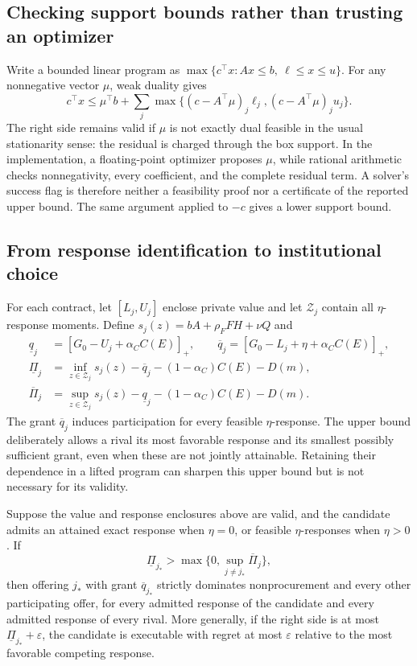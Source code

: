 \subsection{Checking support bounds rather than trusting an optimizer}
Write a bounded linear program as $\max\{c^\top x:Ax\leq b,\ \ell\leq x\leq u\}$. For any nonnegative vector $\mu$, weak duality gives
\begin{equation}
 c^\top x\leq \mu^\top b+
 \sum_j\max\{(c-A^\top\mu)_j\ell_j,(c-A^\top\mu)_ju_j\}.
 \label{eq:dual}
\end{equation}
The right side remains valid if $\mu$ is not exactly dual feasible in the usual stationarity sense: the residual is charged through the box support. In the implementation, a floating-point optimizer proposes $\mu$, while rational arithmetic checks nonnegativity, every coefficient, and the complete residual term. A solver's success flag is therefore neither a feasibility proof nor a certificate of the reported upper bound. The same argument applied to $-c$ gives a lower support bound.

\subsection{From response identification to institutional choice}
For each contract, let $[L_j,U_j]$ enclose private value and let $\mathcal Z_j$ contain all $\eta$-response moments. Define $s_j(z)=bA+\rho_F FH+\nu Q$ and
\begin{align}
 \underline q_j&=[G_0-U_j+\alpha_C C(E)]_+,\qquad
 \overline q_j=[G_0-L_j+\eta+\alpha_C C(E)]_+,\label{eq:grants}\\
 \underline\Pi_j&=\inf_{z\in\mathcal Z_j}s_j(z)-\overline q_j-(1-\alpha_C)C(E)-D(m),\label{eq:lowerprofit}\\
 \overline\Pi_j&=\sup_{z\in\mathcal Z_j}s_j(z)-\underline q_j-(1-\alpha_C)C(E)-D(m).\label{eq:upperprofit}
\end{align}
The grant $\overline q_j$ induces participation for every feasible $\eta$-response. The upper bound deliberately allows a rival its most favorable response and its smallest possibly sufficient grant, even when these are not jointly attainable. Retaining their dependence in a lifted program can sharpen this upper bound but is not necessary for its validity.

\begin{theorem}
\label{thm:procurement}
Suppose the value and response enclosures above are valid, and the candidate admits an attained exact response when $\eta=0$, or feasible $\eta$-responses when $\eta>0$. If
\begin{equation}
 \underline\Pi_{j_*}>\max\{0,\sup_{j\ne j_*}\overline\Pi_j\},
 \label{eq:separation}
\end{equation}
then offering $j_*$ with grant $\overline q_{j_*}$ strictly dominates nonprocurement and every other participating offer, for every admitted response of the candidate and every admitted response of every rival. More generally, if the right side is at most $\underline\Pi_{j_*}+\varepsilon$, the candidate is executable with regret at most $\varepsilon$ relative to the most favorable competing response.
\end{theorem}

